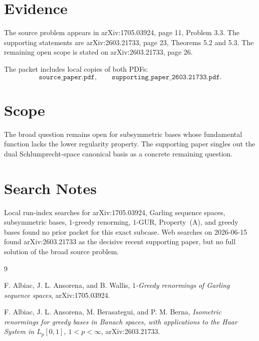 \documentclass[11pt]{article}
\begin{document}
\section*{Evidence}

The source problem appears in arXiv:1705.03924, page 11, Problem 3.3. The
supporting statements are arXiv:2603.21733, page 23, Theorems 5.2 and 5.3.
The remaining open scope is stated on arXiv:2603.21733, page 26.

The packet includes local copies of both PDFs:
\[
\texttt{source\_paper.pdf}, \qquad
\texttt{supporting\_paper\_2603.21733.pdf}.
\]

\section*{Scope}

The broad question remains open for subsymmetric bases whose fundamental
function lacks the lower regularity property. The supporting paper singles out
the dual Schlumprecht-space canonical basis as a concrete remaining question.

\section*{Search Notes}

Local run-index searches for arXiv:1705.03924, Garling sequence spaces,
subsymmetric bases, \(1\)-greedy renorming, \(1\)-GUR, Property~(A), and greedy
bases found no prior packet for this exact subcase. Web searches on
2026-06-15 found arXiv:2603.21733 as the decisive recent supporting paper, but
no full solution of the broad source problem.

\begin{thebibliography}{9}

F. Albiac, J. L. Ansorena, and B. Wallis,
\emph{\(1\)-Greedy renormings of Garling sequence spaces},
arXiv:1705.03924.

F. Albiac, J. L. Ansorena, M. Berasategui, and P. M. Berna,
\emph{Isometric renormings for greedy bases in Banach spaces, with applications
to the Haar System in \(L_p[0,1]\), \(1<p<\infty\)},
arXiv:2603.21733.

\end{thebibliography}
\end{document}
